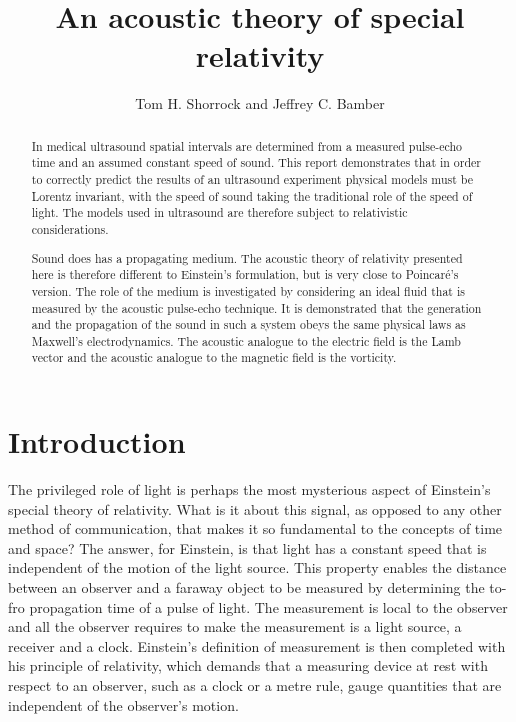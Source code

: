 \documentclass[10pt, fleqn,final,showtrims,oldfontcommands, article,a4paper,oneside]{memoir} %
\newcommand{\Poincare}{Poincar{\'e}\xspace}
\begin{document}
\title{An acoustic theory of special relativity}

\author{Tom H. Shorrock and Jeffrey C. Bamber}

\maketitle

\begin{abstract}

In medical ultrasound spatial intervals are determined  from a measured pulse-echo time and an  assumed constant speed of sound.
This report demonstrates that in order to correctly predict the results of an ultrasound experiment
physical models must be Lorentz invariant, with the speed of sound taking the traditional  role of the speed of light.
The models used in ultrasound are therefore subject to relativistic considerations.

Sound does has a propagating medium.
The  acoustic theory of relativity presented here is therefore  different to Einstein's formulation,
but is very close to \Poincare's version.
The role of the medium is investigated by considering  an 
ideal fluid that is measured by the acoustic pulse-echo technique.
It is demonstrated that the generation and the propagation of the sound in such a system obeys the same physical laws as Maxwell's  electrodynamics.
The acoustic analogue to the electric field is the Lamb vector 
and the acoustic analogue to the magnetic field is the vorticity.


\end{abstract}

\section{Introduction}\label{sec:introduction}

The privileged role of light is perhaps the most mysterious aspect of Einstein's special theory of relativity.
What is it about this signal, as opposed to any other method of communication, that makes it  so fundamental to the  concepts of time and space?
The answer, for Einstein, is  that light has a constant speed that  is independent of the motion of the light source\cite{Einstein1905}.
This  property enables the  distance between an observer and a faraway object  to be measured  by determining the to-fro propagation time of a pulse of light.
The measurement is local to the observer and all the observer requires to make the measurement 
 is a light source, a receiver and a clock.
Einstein's definition of measurement is then completed with his principle of relativity,
which demands that a measuring device at rest with respect to an observer, such as a clock or a metre rule, 
gauge quantities that are independent of the observer's motion\cite{Einstein1905, Pierseaux2005}.
\end{document}
